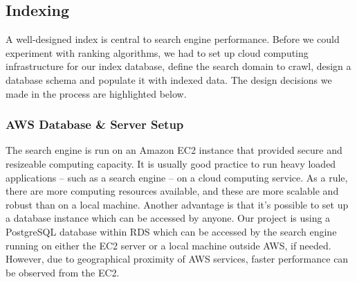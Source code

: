 \begin{table}[H]
\centering
\caption{compositions of test datasets}
\label{my-label}
\end{table}



\subsection{Indexing} %
\label{sub:methods}
A well-designed index is central to search engine performance. Before we could experiment with ranking algorithms, we had to set up cloud computing infrastructure for our index database, define the search domain to crawl, design a database schema and populate it with indexed data. The design decisions we made in the process are highlighted below. %

\subsubsection{AWS Database \& Server Setup} %
\label{ssub:database_and_server_setup}

The search engine is run on an Amazon EC2 instance that provided secure and resizeable computing capacity. It is usually good practice to run heavy loaded applications -- such as a search engine -- on a cloud computing service. As a rule, there are more computing resources available, and these are more scalable and robust than on a local machine. Another advantage is that it's possible to set up a database instance which can be accessed by anyone. Our project is using a PostgreSQL database within RDS which can be accessed by the search engine running on either the EC2 server or a local machine outside AWS, if needed. However, due to geographical proximity of AWS services, faster performance can be observed from the EC2.\\

